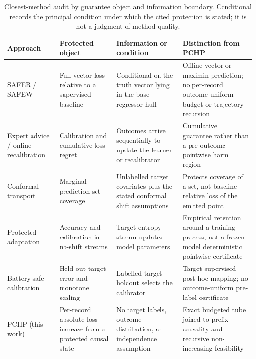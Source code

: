 \documentclass[11pt]{article}
\begin{document}
\begin{table}[t]
  \centering
  \caption{Closest-method audit by guarantee object and information boundary. Conditional records the principal condition under which the cited protection is stated; it is not a judgment of method quality.}
  \label{tab:novelty_audit}
  \small
  \begin{tabularx}{\textwidth}{@{}>{\raggedright\arraybackslash}p{}>{\raggedright\arraybackslash}p{}>{\raggedright\arraybackslash}p{}>{\raggedright\arraybackslash}X@{}}
    \toprule
    Approach & Protected object & Information or condition & Distinction from PCHP \\
    \midrule
    SAFER / SAFEW \citep{li2017safer,li2021safeweak} & Full-vector loss relative to a supervised baseline & Conditional on the truth vector lying in the base-regressor hull & Offline vector or maximin prediction; no per-record outcome-uniform budget or trajectory recursion \\
    Expert advice / online recalibration \citep{chernov2009evaluators,marx2025calibrated,deshpande2025calibrated} & Calibration and cumulative loss regret & Outcomes arrive sequentially to update the learner or recalibrator & Cumulative guarantee rather than a pre-outcome pointwise harm region \\
    Conformal transport \citep{tuwani2023transport,filgueira2026conformalized} & Marginal prediction-set coverage & Unlabelled target covariates plus the stated conformal shift assumptions & Protects coverage of a set, not baseline-relative loss of the emitted point \\
    Protected adaptation \citep{bar2024protected} & Accuracy and calibration in no-shift streams & Target entropy stream updates model parameters & Empirical retention around a training process, not a frozen-model deterministic pointwise certificate \\
    Battery safe calibration \citep{nyachionjeka2026safecalibrated} & Held-out target error and monotone scaling & Labelled target holdout selects the calibrator & Target-supervised post-hoc mapping; no outcome-uniform pre-label certificate \\
    PCHP (this work) & Per-record absolute-loss increase from a protected causal state & No target labels, outcome distribution, or independence assumption & Exact budgeted tube joined to prefix causality and recursive non-increasing feasibility \\
    \bottomrule
  \end{tabularx}
\end{table}
\FloatBarrier
\end{document}

